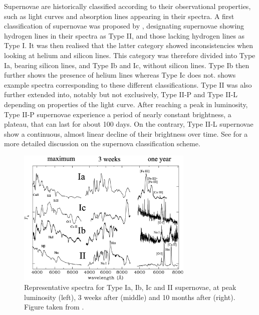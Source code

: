 Supernovae are historically classified according to their observational properties, such as light curves and absorption lines appearing in their spectra. A first classification of supernovae was proposed by \cite{Minkowski1941}, designating supernovae showing hydrogen lines in their spectra as Type II, and those lacking hydrogen lines as Type I. It was then realised that the latter category showed inconsistencies when looking at helium and silicon lines. This category was therefore divided into Type Ia, bearing silicon lines, and Type Ib and Ic, without silicon lines. Type Ib then further shows the presence of helium lines whereas Type Ic does not.  shows example spectra corresponding to these different classifications. Type II was also further extended into, notably but not exclusively, Type II-P and Type II-L depending on properties of the light curve. After reaching a peak in luminosity, Type II-P supernovae experience a period of nearly constant brightness, a plateau, that can last for about 100 days. On the contrary, Type II-L supernovae show a continuous, almost linear decline of their brightness over time. See \cite{Cappellaro2001} for a more detailed discussion on the supernova classification scheme.

\begin{figure}[ht!]
    \centering
    \includegraphics[width=0.75\textwidth]{figures/sn_curves.png}
    \caption{Representative spectra for Type Ia, Ib, Ic and II supernovae, at peak luminosity (left), 3 weeks after (middle) and 10 months after (right). Figure taken from \cite{Turatto2003}.}
    \label{fig:sn_curves}
\end{figure}

